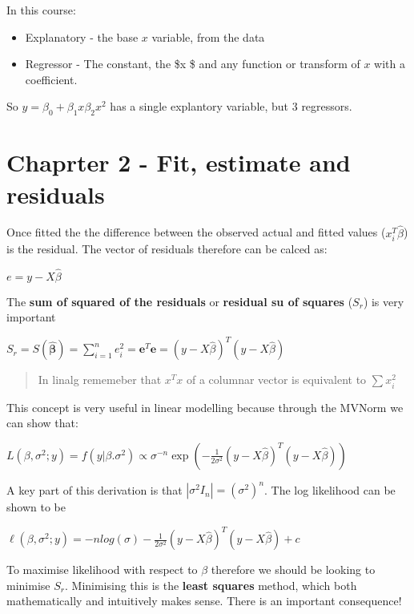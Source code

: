 \documentclass[
  letterpaper,
  DIV=11,
  numbers=noendperiod]{scrreprt}
\providecommand{\tightlist}{%
  \setlength{\itemsep}{0pt}\setlength{\parskip}{0pt}}\usepackage{longtable,booktabs,array}
\begin{document}
In this course:

\begin{itemize}
\tightlist
\item
  Explanatory - the base \(x\) variable, from the data
\item
  Regressor - The constant, the \$\beta x \$ and any function or
  transform of \(x\) with a coefficient.
\end{itemize}

So \(y = \beta_0 + \beta_1 x \beta_2 x^2\) has a single explantory
variable, but 3 regressors.

\hypertarget{chaprter-2---fit-estimate-and-residuals}{%
\section{Chaprter 2 - Fit, estimate and
residuals}\label{chaprter-2---fit-estimate-and-residuals}}

Once fitted the the difference between the observed actual and fitted
values (\(x_i^T\hat{\beta}\)) is the residual. The vector of residuals
therefore can be calced as:

\(e = y - X\hat{\beta}\)

The \textbf{sum of squared of the residuals} or \textbf{residual su of
squares} (\(S_r\)) is very important

\(S_r = S(\hat{\boldsymbol{\beta}}) = \sum_{i=1}^n e_i^2 =\textbf{e}^T\textbf{e} = (y - X\hat{\beta})^T(y - X\hat{\beta})\)

\begin{quote}
In linalg rememeber that \(x^Tx\) of a columnar vector is equivalent to
\(\sum x^2_i\)
\end{quote}

This concept is very useful in linear modelling because through the
MVNorm we can show that:

\(L(\beta, \sigma^2 ; y) = f(y|\beta. \sigma^2) \propto \sigma^{-n}\exp(- \frac{1}{2\sigma^2}(y - X\hat{\beta})^T(y - X\hat{\beta}))\)

A key part of this derivation is that \(|\sigma^2I_n| = (\sigma^2)^n\).
The log likelihood can be shown to be

\(\ell(\beta, \sigma^2;y) = -nlog(\sigma) - \frac{1}{2\sigma^2}(y - X\hat{\beta})^T(y - X\hat{\beta}) + c\)

To maximise likelihood with respect to \(\beta\) therefore we should be
looking to minimise \(S_r\). Minimising this is the \textbf{least
squares} method, which both mathematically and intuitively makes sense.
There is an important consequence!
\end{document}
